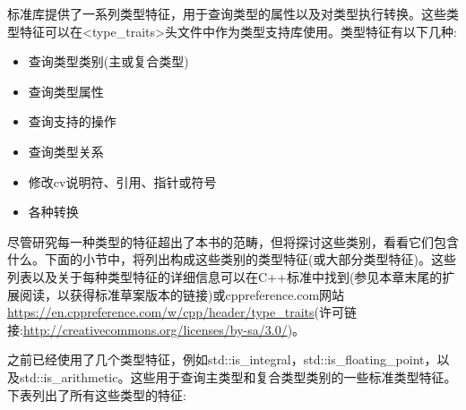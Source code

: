 
标准库提供了一系列类型特征，用于查询类型的属性以及对类型执行转换。这些类型特征可以在<type\_traits>头文件中作为类型支持库使用。类型特征有以下几种:

\begin{itemize}
\item
查询类型类别(主或复合类型)

\item
查询类型属性

\item
查询支持的操作

\item
查询类型关系

\item
修改cv说明符、引用、指针或符号

\item
各种转换
\end{itemize}

尽管研究每一种类型的特征超出了本书的范畴，但将探讨这些类别，看看它们包含什么。下面的小节中，将列出构成这些类别的类型特征(或大部分类型特征)。这些列表以及关于每种类型特征的详细信息可以在C++标准中找到(参见本章末尾的扩展阅读，以获得标准草案版本的链接)或cppreference.com网站\url{https://en.cppreference.com/w/cpp/header/type_traits}(许可链接:\url{http://creativecommons.org/licenses/by-sa/3.0/})。


之前已经使用了几个类型特征，例如std::is\_integral，std::is\_floating\_point，以及std::is\_arithmetic。这些用于查询主类型和复合类型类别的一些标准类型特征。下表列出了所有这些类型的特征:


